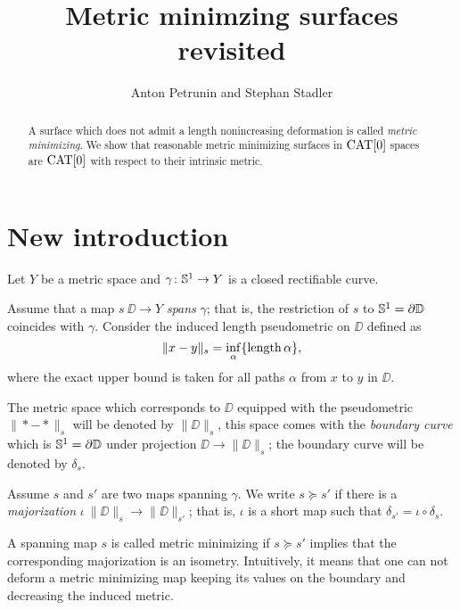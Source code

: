 \documentclass{article}
\begin{document}
\title{Metric minimzing surfaces revisited}
\author{Anton Petrunin and Stephan Stadler}


\date{}

\maketitle

\begin{abstract}
A surface which does not admit a length nonincreasing deformation is called \emph{metric minimizing}.
We show that reasonable metric minimizing surfaces in $\mathop{\rm CAT}\nolimits[0]$ spaces are $\mathop{\rm CAT}\nolimits[0]$ with respect to their intrinsic metric. 

\end{abstract}

\section{New introduction}

Let $Y$ be a metric space and $\gamma\colon\mathbb{S}^1\to Y$ is a closed rectifiable curve.

Assume that a map $s\:\DD\to Y$ \emph{spans} $\gamma$;
that is, the restriction of $s$ to $\mathbb{S}^1=\partial\mathbb{D}$ coincides with $\gamma$.
Consider the induced length pseudometric on $\DD$ defined as 
\[\|x-y\|_s=\inf_\alpha\{\mathop{\rm length}\nolimits\alpha\},\]
where the exact upper bound is taken for all paths $\alpha$ from $x$ to $y$ in $\DD$.

The metric space which corresponds to $\DD$ equipped with the pseudometric  $\|{*}-{*}\|_s$ will be denoted by $\|\DD\|_s$, this space comes with the \emph{boundary curve} which is $\mathbb{S}^1=\partial\mathbb{D}$ under projection $\DD\to\|\DD\|_s$; the boundary curve will be denoted by $\delta_s$.

Assume $s$ and $s'$ are two maps spanning $\gamma$.
We write $s\succcurlyeq s'$ if there is a \emph{majorization}
$\iota\:\|\DD\|_s\to \|\DD\|_{s'}$;
that is, $\iota$ is a short map such that $\delta_{s'}=\iota\circ\delta_s$.

A spanning map $s$ is called metric minimizing if $s\succcurlyeq s'$ implies that the corresponding majorization is an isometry.
Intuitively, it means that one can not deform a  metric minimizing map keeping its values on the boundary and decreasing the induced metric.
\end{document}
